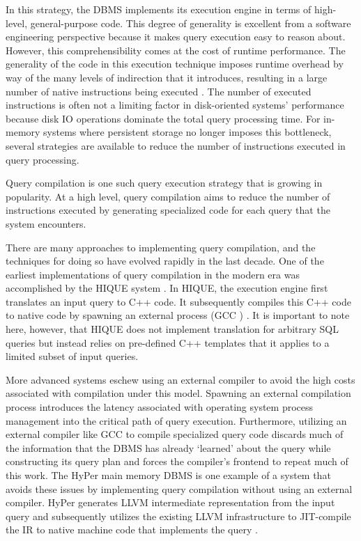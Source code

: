 \documentclass{vldb}
\begin{document}
In this strategy, the DBMS implements its execution engine in terms of high-level, general-purpose code. This degree of generality is excellent from a software engineering perspective because it makes query execution easy to reason about. However, this comprehensibility comes at the cost of runtime performance. The generality of the code in this execution technique imposes runtime overhead by way of the many levels of indirection that it introduces, resulting in a large number of native instructions being executed \cite{freedman14}. The number of executed instructions is often not a limiting factor in disk-oriented systems' performance because disk IO operations dominate the total query processing time. For in-memory systems where persistent storage no longer imposes this bottleneck, several strategies are available to reduce the number of instructions executed in query processing.

Query compilation is one such query execution strategy that is growing in popularity. At a high level, query compilation aims to reduce the number of instructions executed by generating specialized code for each query that the system encounters. 

There are many approaches to implementing query compilation, and the techniques for doing so have evolved rapidly in the last decade. One of the earliest implementations of query compilation in the modern era was accomplished by the HIQUE system \cite{systemr}. In HIQUE, the execution engine first translates an input query to C++ code. It subsequently compiles this C++ code to native code by spawning an external process (GCC \cite{gcc}) \cite{krikellas10}. It is important to note here, however, that HIQUE does not implement translation for arbitrary SQL queries but instead relies on pre-defined C++ templates that it applies to a limited subset of input queries.

More advanced systems eschew using an external compiler to avoid the high costs associated with compilation under this model. Spawning an external compilation process introduces the latency associated with operating system process management into the critical path of query execution. Furthermore, utilizing an external compiler like GCC to compile specialized query code discards much of the information that the DBMS has already `learned' about the query while constructing its query plan and forces the compiler's frontend to repeat much of this work. The HyPer main memory DBMS \cite{hyper} is one example of a system that avoids these issues by implementing query compilation without using an external compiler. HyPer generates LLVM \cite{LLVM} intermediate representation from the input query and subsequently utilizes the existing LLVM infrastructure to JIT-compile the IR to native machine code that implements the query \cite{neumann11, kemper11}.
\end{document}
